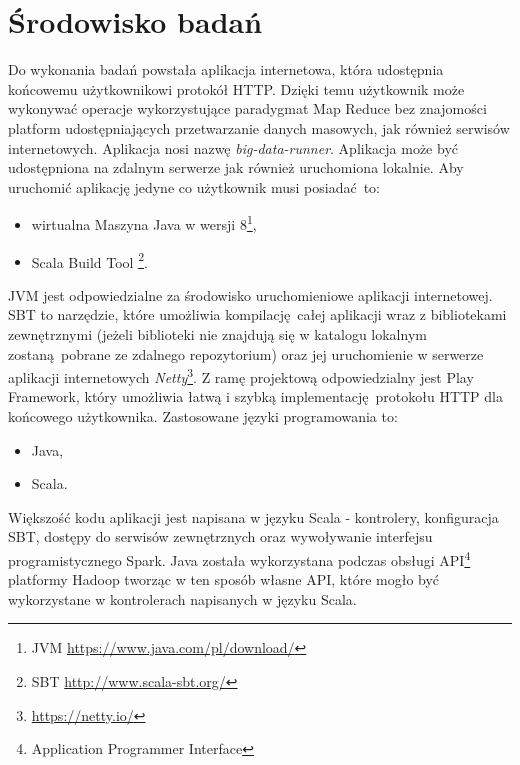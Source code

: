 \section{Środowisko badań}
Do wykonania badań powstała aplikacja internetowa, która udostępnia końcowemu użytkownikowi protokół HTTP. Dzięki temu użytkownik może wykonywać operacje wykorzystujące paradygmat Map Reduce bez znajomości platform udostępniających przetwarzanie danych masowych, jak również serwisów internetowych. Aplikacja nosi nazwę \textit{big-data-runner}. Aplikacja może być udostępniona na zdalnym serwerze jak również uruchomiona lokalnie. Aby uruchomić aplikację jedyne co użytkownik musi posiadać to:
\begin{itemize}
	\item{wirtualna Maszyna Java w wersji 8\footnote{JVM \url{https://www.java.com/pl/download/}}},
	\item{Scala Build Tool \footnote{SBT \url{http://www.scala-sbt.org/}}}.
\end{itemize}
JVM jest odpowiedzialne za środowisko uruchomieniowe aplikacji internetowej. SBT to narzędzie, które umożliwia kompilację całej aplikacji wraz z bibliotekami zewnętrznymi (jeżeli biblioteki nie znajdują się w katalogu lokalnym zostaną pobrane ze zdalnego repozytorium) oraz jej uruchomienie w serwerze aplikacji internetowych \textit{Netty}\footnote{\url{https://netty.io/}}. Z ramę projektową odpowiedzialny jest Play Framework, który umożliwia łatwą i szybką implementację protokołu HTTP dla końcowego użytkownika.
\newpage
Zastosowane języki programowania to:
\begin{itemize}
	\item {Java},
	\item {Scala}.
\end{itemize}

Większość kodu aplikacji jest napisana w języku Scala - kontrolery, konfiguracja SBT, dostępy do serwisów zewnętrznych oraz wywoływanie interfejsu programistycznego Spark. Java została wykorzystana podczas obsługi API\footnote{Application Programmer Interface} platformy Hadoop tworząc w ten sposób własne API, które mogło być wykorzystane w kontrolerach napisanych w języku Scala.

